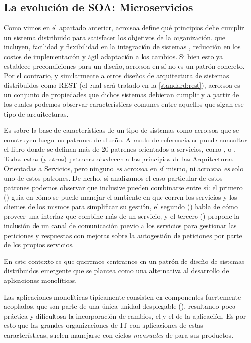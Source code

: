 \subsection{La evolución de SOA: Microservicios}
\label{microservicios}

Como vimos en el apartado anterior, \gls{acro:soa} define qué principios debe cumplir un sistema distribuido para satisfacer los objetivos de la organización, que incluyen, facilidad y flexibilidad en la integración de sistemas , reducción en los costos de implementación y ágil adaptación a los cambios. Si bien esto ya establece precondiciones para un diseño, \gls{acro:soa} en sí no es un patrón concreto. Por el contrario, y similarmente a otros diseños de arquitectura de sistemas distribuidos como REST (el cual será tratado en la \autoref{standard:rest}), \gls{acro:soa} es un conjunto de propiedades que dichos sistemas debieran cumplir y a partir de los cuales podemos observar características comunes entre aquellos que sigan ese tipo de arquitecturas.

Es sobre la base de características de un tipo de sistemas como \gls{acro:soa} que se construyen luego los patrones de diseño. A modo de referencia se puede consultar el libro  donde se definen más de 20 patrones orientados a servicios, como \cite[p.~19]{soapatterns}, \cite[p.~148]{soapatterns} o \cite[p.162]{soapatterns}. Todos estos (y otros) patrones obedecen a los principios de las Arquitecturas Orientadas a Servicios, pero ninguno \textit{es} \gls{acro:soa} en sí mismo, ni \gls{acro:soa} \textit{es} solo uno de estos patrones. De hecho, si analizamos el caso particular de estos patrones podemos observar que inclusive pueden combinarse entre sí: el primero () guía en cómo se puede manejar el ambiente en que corren los servicios y los clientes de los mismos para simplificar su gestión, el segundo () habla de cómo proveer una interfaz que combine más de un servicio, y el tercero () propone la inclusión de un canal de comunicación previo a los servicios para gestionar las peticiones y respuestas con mejoras sobre la autogestión de peticiones por parte de los propios servicios.

En este contexto es que queremos centrarnos en un patrón de diseño de sistemas distribuidos emergente que se plantea como una alternativa al desarrollo de aplicaciones monolíticas.

Las aplicaciones monolíticas típicamente consisten en componentes fuertemente acoplados, que son parte de una única unidad desplegable (), resultando poco práctica y dificultosa la incorporación de cambios, el  y el  de la aplicación. Es por esto que las grandes organizaciones de IT con aplicaciones de estas características, suelen manejarse con ciclos \textit{mensuales} de  para sus productos.

